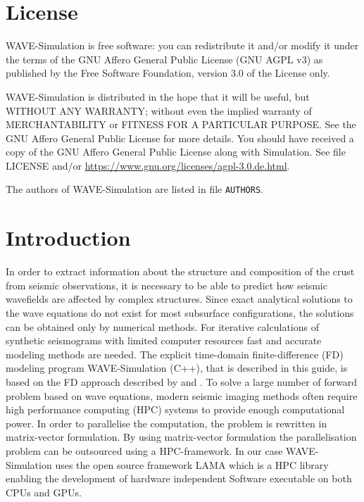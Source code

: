 \documentclass[pdftex,a4paper,parskip,listof=totoc,bibliography=totoc,onehalfspacing,12pt]{scrreprt}
\begin{document}
\setcounter{page}{1}

\cleardoublepage
\chapter*{License}

WAVE-Simulation is free software: you can redistribute it and/or modify it under the terms of the GNU Affero General Public License (GNU AGPL v3) as published by the Free Software Foundation, version 3.0 of the License only.
 
WAVE-Simulation is distributed in the hope that it will be useful, but WITHOUT ANY WARRANTY; without even the implied warranty of MERCHANTABILITY or FITNESS FOR A PARTICULAR PURPOSE. See the GNU Affero General Public License for more details. You should have received a copy of the GNU Affero General Public License along with Simulation. See file LICENSE and/or \url{https://www.gnu.org/licenses/agpl-3.0.de.html}.

The authors of WAVE-Simulation are listed in file \lstinline{AUTHORS}.

\cleardoublepage
\chapter*{Introduction}

In order to extract information about the structure and composition of the crust from seismic observations, it is necessary to be able to predict how seismic wavefields are affected by complex structures. Since exact analytical solutions to the wave equations do not exist for most subsurface configurations, the solutions can be obtained only by numerical methods. For iterative calculations of synthetic seismograms with limited computer resources fast and accurate modeling methods are needed. The explicit time-domain finite-difference (FD) modeling program WAVE-Simulation (C++), that is described in this guide, is based on the FD approach described by \cite{virieux1986p} and \cite{levander1988fourth}. To solve a large number of forward problem based on wave equations, modern seismic imaging methods often require high performance computing (HPC) systems to provide enough computational power. In order to parallelise the computation, the problem is rewritten in matrix-vector formulation. By using matrix-vector formulation the parallelisation problem can be outsourced using a HPC-framework. In our case WAVE-Simulation uses the open source framework LAMA which is a HPC library enabling the development of hardware independent Software executable on both CPUs and GPUs.
\end{document}
